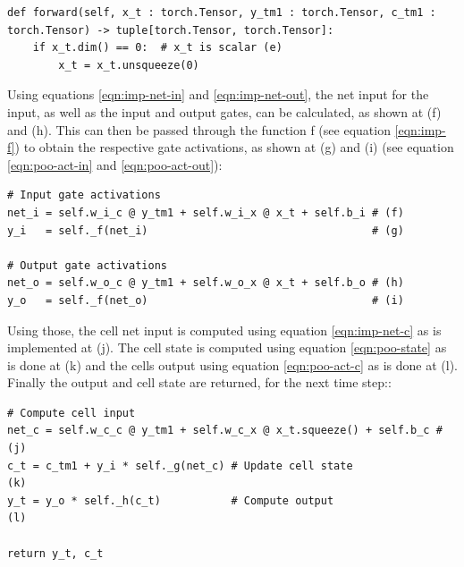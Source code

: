 \documentclass[twoside,a4paper,10pt,DIV=12,BCOR=12mm]{scrartcl}
\begin{document}
\begin{lstlisting}
def forward(self, x_t : torch.Tensor, y_tm1 : torch.Tensor, c_tm1 : torch.Tensor) -> tuple[torch.Tensor, torch.Tensor]:
    if x_t.dim() == 0:  # x_t is scalar (e)
        x_t = x_t.unsqueeze(0)
\end{lstlisting}
Using equations \ref{eqn:imp-net-in} and \ref{eqn:imp-net-out}, the net input for the input, as well as the input and output gates, can be calculated, as shown at (f) and (h). This can then be passed through the function f (see equation \ref{eqn:imp-f}) to obtain the respective gate activations, as shown at (g) and (i) (see equation  \ref{eqn:poo-act-in} and \ref{eqn:poo-act-out}):\cite{hochreiter1997lstm, keras-lstm, pytorch-lstm}
\begin{lstlisting}
# Input gate activations
net_i = self.w_i_c @ y_tm1 + self.w_i_x @ x_t + self.b_i # (f)
y_i   = self._f(net_i)                                   # (g)
        
# Output gate activations
net_o = self.w_o_c @ y_tm1 + self.w_o_x @ x_t + self.b_o # (h)
y_o   = self._f(net_o)                                   # (i)
\end{lstlisting}
Using those, the cell net input is computed using equation \ref{eqn:imp-net-c} as is implemented at (j). 
The cell state is computed using equation \ref{eqn:poo-state} as is done at (k) and the cells output using equation \ref{eqn:poo-act-c} as is done at (l). Finally the output and cell state are returned, for the next time step:\cite{hochreiter1997lstm,keras-lstm, pytorch-lstm}:
\begin{lstlisting}
# Compute cell input
net_c = self.w_c_c @ y_tm1 + self.w_c_x @ x_t.squeeze() + self.b_c # (j)
c_t = c_tm1 + y_i * self._g(net_c) # Update cell state               (k)
y_t = y_o * self._h(c_t)           # Compute output                  (l)
        
return y_t, c_t
\end{lstlisting}
\end{document}
